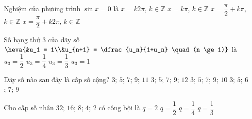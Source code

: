 \begin{ex}%
	Nghiệm của phương trình $\sin x = 0$ là
	\choice
	{$x=k2\pi$, $k \in \mathbb{Z}$}
	{\True $x=k\pi$, $k \in \mathbb{Z}$}
	{$x=\dfrac{\pi}{2} + k\pi$, $k \in \mathbb{Z}$}
	{$x=\dfrac{\pi}{2} + k2\pi$, $k \in \mathbb{Z}$}
\end{ex}
\begin{ex}%
	Số hạng thứ $3$ của dãy số $\heva{&u_1 = 1\\&u_{n+1} = \dfrac{u_n}{1+u_n} \quad (n \ge 1)}$ là	
	\choice
	{$u_3=\dfrac{1}{2}$}
	{$u_3=\dfrac{1}{4}$}
	{\True $u_3=\dfrac{1}{3}$}
	{$u_3=1$}
\end{ex}
\begin{ex}%
	Dãy số nào sau đây là cấp số cộng?
	\choice
	{\True $3$; $5$; $7$; $9$; $11$}
	{$3$; $5$; $7$; $9$; $12$}
	{$3$; $5$; $7$; $9$; $10$}
	{$3$; $5$; $6$; $7$; $9$}
\end{ex}
\begin{ex}%
	Cho cấp số nhân $32$; $16$; $8$; $4$; $2$ có công bội là
	\choice
	{$q=2$}
	{\True $q=\dfrac{1}{2}$}
	{$q=\dfrac{1}{4}$}
	{$q=\dfrac{1}{3}$}
\end{ex}
